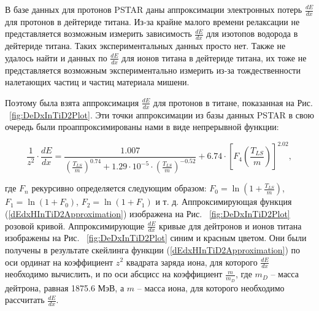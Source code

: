 \documentclass[a4paper,12pt]{article}
\begin{document}
\begin{large}
 	В базе данных для протонов PSTAR даны аппроксимации электронных потерь $\frac{dE}{dx}$ для протонов в дейтериде титана.
 	Из-за крайне малого времени релаксации не представляется возможным измерить зависимость $\frac{dE}{dx}$ для изотопов водорода в дейтериде титана.
 	Таких экспериментальных данных просто нет.
 	Также не удалось найти и данных по $\frac{dE}{dx}$ для ионов титана в дейтериде титана, их тоже не представляется возможным экспериментально измерить из-за тождественности налетающих частиц и частиц материала мишени.
  
 	Поэтому была взята аппроксимация $\frac{dE}{dx}$ для протонов в титане, показанная на Рис. ~\ref{fig:DeDxInTiD2Plot}.
 	Эти точки аппроксимации из базы данных PSTAR в свою очередь были проаппроксимированы нами в виде непрерывной функции:
  
\begin{equation}
  \label{dEdxHInTiD2Approximation}    
	  \frac{1}{z^2} \cdot \frac{dE}{dx}=\frac{1.007}{ \left( \frac{T_{LS}}{m} \right)^{0.74}+1.29 \cdot 10^{-5} \cdot \left( \frac{T_{LS}}{m} \right)^{-0.52} } + 6.74 \cdot \left[ F_4 \left( \frac{T_{LS}}{m} \right) \right]^{2.02},
\end{equation}

	где $F_n$ рекурсивно определяется следующим образом: $F_0=\ln{\left( 1+\frac{T_{LS}}{m} \right)}$, $F_1=\ln{\left( 1+F_0 \right)}$, $F_2=\ln{\left( 1+F_1 \right)}$ и т. д.
	Аппроксимирующая функция (\ref{dEdxHInTiD2Approximation}) изображена на Рис. ~\ref{fig:DeDxInTiD2Plot} розовой кривой. Аппроксимирующие $\frac{dE}{dx}$ кривые для дейтронов и ионов титана изображены на Рис. ~\ref{fig:DeDxInTiD2Plot} синим и красным цветом.
	Они были получены в результате скейлинга функции (\ref{dEdxHInTiD2Approximation}) по оси ординат на коэффициент $z^2$ квадрата заряда иона, для которого $\frac{dE}{dx}$ необходимо вычислить, и по оси абсцисс на коэффициент $\frac{m}{m_D}$, где $m_D$ -- масса дейтрона, равная 1875.6 МэВ, а $m$ -- масса иона, для которого необходимо рассчитать $\frac{dE}{dx}$. 
  

\end{large}
\end{document}
